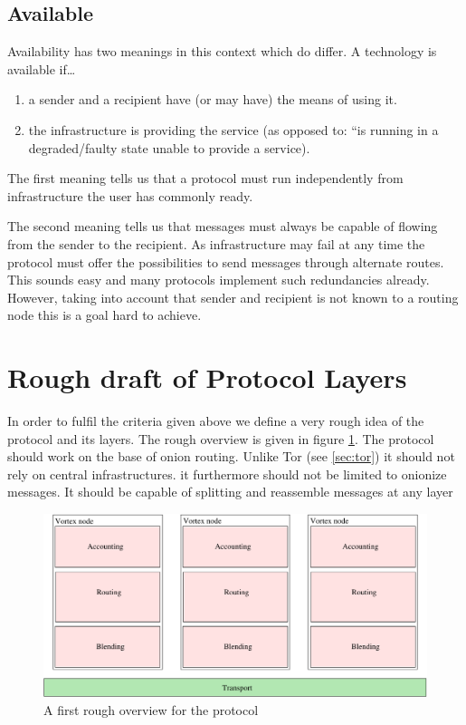 \subsection{Available}
Availability has two meanings in this context which do differ. A technology is available if\ldots
\begin{enumerate}
	\item a sender and a recipient have (or may have) the means of using it.
	\item the infrastructure is providing the service (as opposed to: ``is running in a degraded/faulty state unable to provide a service).
\end{enumerate}

The first meaning tells us that a protocol must run independently from infrastructure the user has commonly ready.

The second meaning tells us that messages must always be capable of flowing from the sender to the recipient. As infrastructure may fail at any time the protocol must offer the possibilities to send messages through alternate routes. This sounds easy and many protocols implement such redundancies already. However, taking into account that sender and recipient is not known to a routing node this is a goal hard to achieve.

\section{Rough draft of Protocol Layers}
In order to fulfil the criteria given above we define a very rough idea of the protocol and its layers. The rough overview is given in figure \ref{fig:roughProtocolDesign}. The protocol should work on the base of onion routing. Unlike Tor (see \ref{sec:tor}) it should not rely on central infrastructures. it furthermore should not be limited to onionize messages. It should be capable of splitting and reassemble messages at any layer 

\begin{figure}[h]
	\includegraphics[width=\columnwidth]{inc/roughProtocolDesign.pdf}
	\caption{A first rough overview for the protocol}
	\label{fig:roughProtocolDesign}
\end{figure}	

